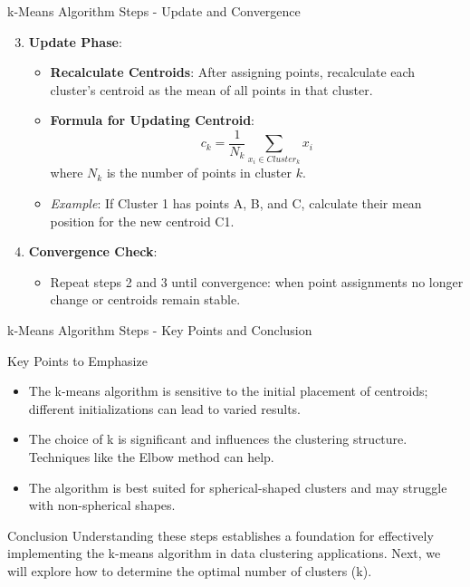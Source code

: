 \documentclass[aspectratio=169]{beamer}
\begin{document}
\begin{frame}[fragile]{k-Means Algorithm Steps - Update and Convergence}
    \begin{enumerate}
        \setcounter{enumi}{2}
        \item \textbf{Update Phase}:
            \begin{itemize}
                \item \textbf{Recalculate Centroids}: 
                    After assigning points, recalculate each cluster's centroid as the mean of all points in that cluster.
                \item \textbf{Formula for Updating Centroid}:
                    \begin{equation}
                        c_k = \frac{1}{N_k} \sum_{x_i \in Cluster_k} x_i
                    \end{equation}
                    where \( N_k \) is the number of points in cluster \( k \).
                \item \textit{Example}: If Cluster 1 has points A, B, and C, calculate their mean position for the new centroid C1.
            \end{itemize}

        \item \textbf{Convergence Check}:
            \begin{itemize}
                \item Repeat steps 2 and 3 until convergence: when point assignments no longer change or centroids remain stable.
            \end{itemize}
    \end{enumerate}
\end{frame}

\begin{frame}[fragile]{k-Means Algorithm Steps - Key Points and Conclusion}
    \begin{block}{Key Points to Emphasize}
        \begin{itemize}
            \item The k-means algorithm is sensitive to the initial placement of centroids; different initializations can lead to varied results.
            \item The choice of k is significant and influences the clustering structure. Techniques like the Elbow method can help.
            \item The algorithm is best suited for spherical-shaped clusters and may struggle with non-spherical shapes.
        \end{itemize}
    \end{block}

    \begin{block}{Conclusion}
        Understanding these steps establishes a foundation for effectively implementing the k-means algorithm in data clustering applications. Next, we will explore how to determine the optimal number of clusters (k).
    \end{block}
\end{frame}
\end{document}
